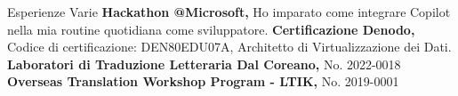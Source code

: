 \begin{rubric}{Esperienze Varie}
\entry*[2024] \textbf{Hackathon @Microsoft,} Ho imparato come integrare Copilot nella mia routine quotidiana come sviluppatore.
%
\entry*[2023] \textbf{Certificazione Denodo,} Codice di certificazione: DEN80EDU07A, Architetto di Virtualizzazione dei Dati.
%
\entry*[2022] \textbf{Laboratori di Traduzione Letteraria Dal Coreano,} No. 2022-0018
%
\entry*[2019] \textbf{Overseas Translation Workshop Program - LTIK,} No. 2019-0001
%
\end{rubric}